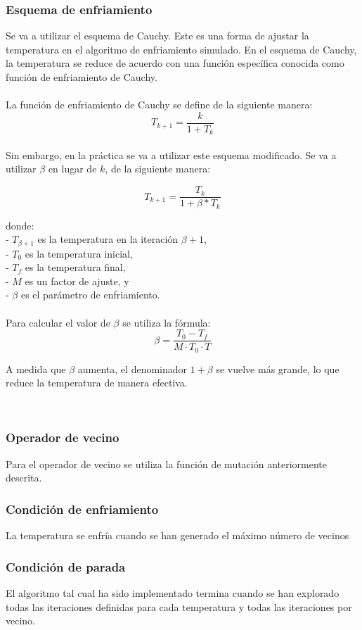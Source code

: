 \documentclass[12pt, spanish]{article}
\begin{document}
\subsubsection{Esquema de enfriamiento}
Se va a utilizar el esquema de Cauchy. Este es una forma de ajustar la temperatura en el algoritmo de enfriamiento simulado. En el esquema de Cauchy, la temperatura se reduce de acuerdo con una función específica conocida como función de enfriamiento de Cauchy.\\
\\
La función de enfriamiento de Cauchy se define de la siguiente manera:\\

    \[ T_{k+1} = \frac{k}{1 + T_k} \]
\\
Sin embargo, en la práctica se va a utilizar este esquema modificado. Se va a utilizar \(\beta\) en lugar de \(k\), de la siguiente manera:

\[ T_{k+1} = \frac{T_k}{1 + \beta*T_{k}} \]

donde:\\
- \( T_{\beta+1} \) es la temperatura en la iteración \( \beta+1 \),\\
- \( T_0 \) es la temperatura inicial,\\
- \( T_f \) es la temperatura final,\\
- \( M \) es un factor de ajuste, y\\
- \( \beta \) es el parámetro de enfriamiento.\\
\\
Para calcular el valor de \( \beta \) se utiliza la fórmula:
\[ \beta = \frac{T_0 - T_f}{M \cdot T_0 \cdot T} \]

A medida que \( \beta \) aumenta, el denominador \( 1 + \beta \) se vuelve más grande, lo que reduce la temperatura de manera efectiva.

\\
\subsubsection{Operador de vecino}
Para el operador de vecino se utiliza la función de mutación anteriormente descrita.
\subsubsection{Condición de enfriamiento}
La temperatura se enfría cuando se han generado el máximo número de vecinos 

\subsubsection{Condición de parada}
El algoritmo tal cual ha sido implementado termina cuando se han explorado todas las iteraciones definidas para cada temperatura y todas las iteraciones por vecino. 
\end{document}

